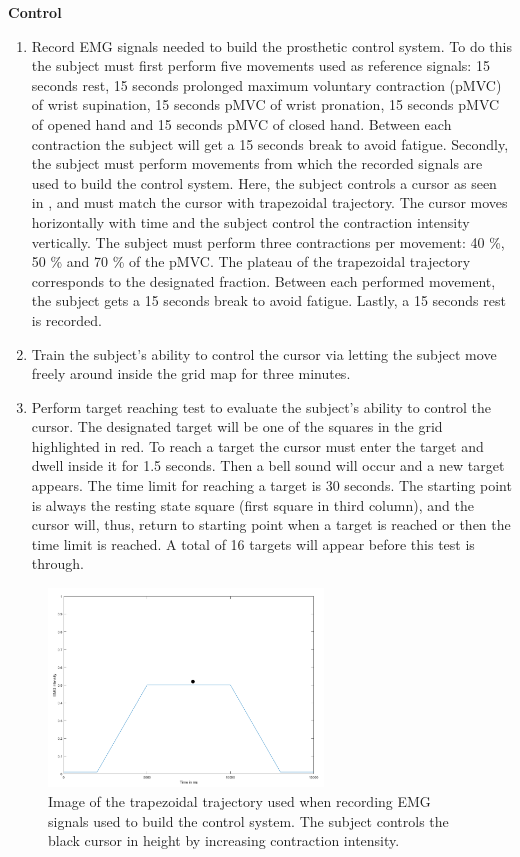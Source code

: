 \textbf{{Control}} \\
\vspace{-25pt}
\begin{enumerate}
	\item Record EMG signals needed to build the prosthetic control system. To do this the subject must first perform  five movements used as reference signals: 15 seconds rest, 15 seconds prolonged maximum voluntary contraction (pMVC) of wrist supination, 15 seconds pMVC of wrist pronation, 15 seconds pMVC of opened hand and 15 seconds pMVC of closed hand. Between each contraction the subject will get a 15 seconds break to avoid fatigue. Secondly, the subject must perform movements from which the recorded signals are used to build the control system. Here, the subject controls a cursor as seen in , and must match the cursor with trapezoidal trajectory. The cursor moves horizontally with time and the subject control the contraction intensity vertically. The subject must perform three contractions per movement: 40 \%, 50 \% and 70 \% of the pMVC. The plateau of the trapezoidal trajectory corresponds to the designated fraction. Between each performed movement, the subject gets a 15 seconds break to avoid fatigue. Lastly, a 15 seconds rest is recorded. 
	\item Train the subject's ability to control the cursor via letting the subject move freely around inside the grid map for three minutes.
	\item Perform target reaching test to evaluate the subject's ability to control the cursor. The designated target will be one of the squares in the grid highlighted in red. To reach a target the cursor must enter the target and dwell inside it for 1.5 seconds. Then a bell sound will occur and a new target appears. The time limit for reaching a target is 30 seconds. The starting point is always the resting state square (first square in third column), and the cursor will, thus, return to starting point when a target is reached or then the time limit is reached. A total of 16 targets will appear before this test is through.
\end{enumerate}

\begin{figure}[H]                 
	\includegraphics[width=0.65\textwidth]{figures/trapezoid2}  
	\caption{Image of the trapezoidal trajectory used when recording EMG signals used to build the control system. The subject controls the black cursor in height by increasing contraction intensity.}
	\label{fig:trapezoid} 
\end{figure}

